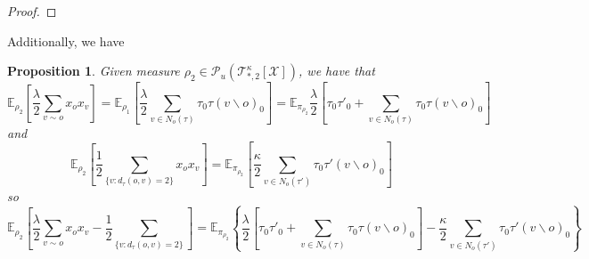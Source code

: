 \documentclass[12pt]{article}
\newtheorem{proposition}[theorem]{Proposition}
\newcommand{\measure}[2]{\mathcal{P}_u(\mathcal{T}_{*, #1}^{#2}[\mathcal{X}])}
\numberwithin{equation}{section}
\begin{document}
\begin{proof}

\end{proof}

Additionally, we have
\begin{proposition}
    Given measure $\rho_2\in\measure{2}{\kappa}$, we have that
    \begin{equation*}
        \mathbb{E}_{\rho_2}\left[\frac\lambda2\sum_{v\sim o} x_o x_v\right] = \mathbb{E}_{\rho_1}\left[\frac\lambda2\sum_{v\in N_o(\tau)} \tau_0\tau(v\backslash o)_0\right] = \mathbb{E}_{\pi_{\rho_2}}\frac\lambda2\left[\tau_0\tau'_0 + \sum_{v\in N_o(\tau)} \tau_0\tau(v\backslash o)_0\right]
    \end{equation*}
    and
    \begin{equation*}
        \mathbb{E}_{\rho_2}\left[\frac12\sum_{\{v:d_\tau(o, v)=2\}} x_o x_v\right] = \mathbb{E}_{\pi_{\rho_2}}\left[\frac\kappa 2\sum_{v\in N_o(\tau')} \tau_0\tau'(v\backslash o)_0\right]
    \end{equation*}
    so
    \begin{equation*}
        \mathbb{E}_{\rho_2}\left[\frac\lambda2\sum_{v\sim o} x_o x_v - \frac12\sum_{\{v:d_\tau(o, v)=2\}}\right] =\mathbb{E}_{\pi_{\rho_2}}
        \left\{\frac\lambda2\left[\tau_0\tau'_0 + \sum_{v\in N_o(\tau)} \tau_0\tau(v\backslash o)_0\right] -
        \frac\kappa 2\sum_{v\in N_o(\tau')} \tau_0\tau'(v\backslash o)_0\right\}
    \end{equation*}
\end{proposition}
\end{document}
